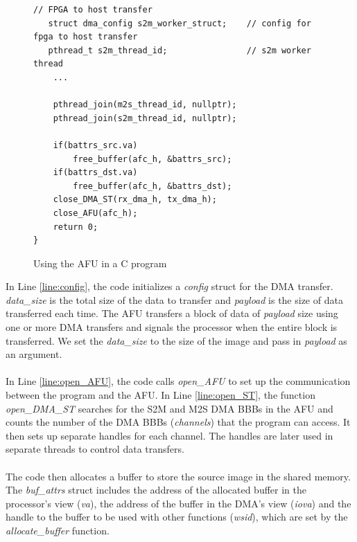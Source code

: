 \documentclass[epsfig,10pt,fullpage]{article}
\begin{document}
\begin{figure}
\begin{center}
\begin{minipage}[h]{17.5 cm}
\begin{lstlisting}[name=C_code]
   // FPGA to host transfer
   struct dma_config s2m_worker_struct;    // config for fpga to host transfer
   pthread_t s2m_thread_id;                // s2m worker thread
    ...
    
	pthread_join(m2s_thread_id, nullptr);
	pthread_join(s2m_thread_id, nullptr);
	
	if(battrs_src.va)
		free_buffer(afc_h, &battrs_src);
	if(battrs_dst.va)
		free_buffer(afc_h, &battrs_dst);
	close_DMA_ST(rx_dma_h, tx_dma_h);
	close_AFU(afc_h);
	return 0;
}
\end{lstlisting}
\end{minipage}
\caption{Using the AFU in a C program}
\label{fig:C_main}
\end{center}
\end{figure}

\noindent
In Line \ref{line:config}, the code initializes a \emph{config} struct for the DMA transfer. \emph{data\_size} is the total size of the data to transfer and \emph{payload} is the size of data transferred each time. The AFU transfers a block of data of \emph{payload} size using one or more DMA transfers and signals the processor when the entire block is transferred. We set the \emph{data\_size} to the size of the image and pass in \emph{payload} as an argument.\\
\\
In Line \ref{line:open_AFU}, the code calls \emph{open\_AFU} to set up the communication between the program and the AFU.  In Line \ref{line:open_ST}, the function {\it open\_DMA\_ST} searches for the S2M and M2S DMA BBBs in the AFU and counts the number of the DMA BBBs ({\it channels}) that the program can access. It then sets up separate handles for each channel. The handles are later used in separate threads to control data transfers.\\
\\
The code then allocates a buffer to store the source image in the shared memory. The {\it buf\_attrs} struct includes the address of the allocated buffer in the processor's view ({\it va}),  the address of the buffer in the DMA's view ({\it iova}) and the handle to the buffer to be used with other functions ({\it wsid}), which are set by the {\it allocate\_buffer} function.\\
\end{document}

